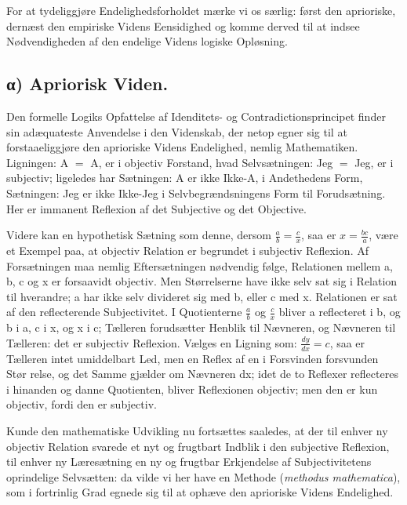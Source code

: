 \documentclass[12pt]{book}
\newcommand{\opage}[1]{\marginnote{\footnotesize\textit{[#1]}}}
\begin{document}
For at tydeliggjøre Endelighedsforholdet mærke vi os særlig: først
den aprioriske, dernæst den empiriske Videns Eensidighed og komme
derved til at indsee Nødvendigheden af den endelige Videns logiske
Opløsning.

\subsection*{α) Apriorisk Viden.}

Den formelle Logiks Opfattelse af Idenditets- og
Contradictionsprincipet finder sin adæquateste Anvendelse i den
Videnskab, der netop egner sig til at forstaaeliggjøre den aprioriske
Videns Endelighed, nemlig Mathematiken. Ligningen: A $=$ A, er i
objectiv Forstand, hvad Selvsætningen: Jeg $=$ Jeg, er i subjectiv;
ligeledes har Sætningen: A er ikke Ikke-A, i Andethedens Form,
Sætningen: Jeg er ikke Ikke-Jeg i Selvbegrændsningens Form til
Forudsætning. Her er immanent Reflexion af det Subjective og det
Objective.

Videre kan en hypothetisk Sætning som denne, dersom
$\frac{a}{b} = \frac{c}{x}$, saa er $x = \frac{bc}{a}$, være et
Exempel paa, at objectiv Relation er begrundet i subjectiv Reflexion.
Af Forsætningen maa nemlig Eftersætningen nødvendig følge, Relationen
mellem a, b, c og x er forsaavidt objectiv. Men Størrelserne have
ikke selv sat sig i Relation til hverandre; a har ikke selv divideret
sig med b, eller c med x. Relationen er sat af den reflecterende
Subjectivitet. I Quotienterne $\frac{a}{b}$ og $\frac{c}{x}$ bliver a
reflecteret i b, og b i a, c i x, og x i c; Tælleren forudsætter
Henblik til Nævneren, og Nævneren til Tælleren: det er subjectiv
Reflexion. Vælges en Ligning som: $\frac{dy}{dx} = c$, saa er
Tælleren intet umiddelbart Led, men en Reflex af en i Forsvinden
forsvunden Stør\-%
\opage{10}relse, og det Samme gjælder om Nævneren dx; idet de to Reflexer
reflecteres i hinanden og danne Quotienten, bliver Reflexionen
objectiv; men den er kun objectiv, fordi den er subjectiv.

Kunde den mathematiske Udvikling nu fortsættes saaledes, at der til
enhver ny objectiv Relation svarede et nyt og frugtbart Indblik i den
subjective Reflexion, til enhver ny Læresætning en ny og frugtbar
Erkjendelse af Subjectivitetens oprindelige Selvsætten: da vilde vi
her have en Methode (\textit{methodus mathematica}), som i fortrinlig
Grad egnede sig til at ophæve den aprioriske Videns Endelighed.
\end{document}
